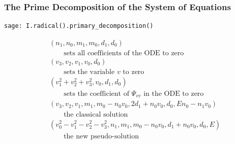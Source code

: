 \documentclass{beamer}
\begin{document}
\begin{frame}[fragile]
\frametitle{The Prime Decomposition of the System of Equations}
\begin{verbatim}
sage: I.radical().primary_decomposition()
\end{verbatim}

\begin{subequations}
\label{ideal}
\begin{align}
& \left(n_{1}, n_{0}, m_{1}, m_{0}, d_{1}, d_{0}\right)\label{ideal:5} \\
& \qquad \text{sets all coefficients of the ODE to zero} \nonumber \\
& \left(v_{3}, v_{2}, v_{1}, v_{0}, d_{0}\right)\label{ideal:4}\\
& \qquad \text{sets the variable $v$ to zero} \nonumber \\
& \left(v_{1}^{2} + v_{2}^{2} + v_{3}^{2}, v_{0}, d_{1}, d_{0}\right)\label{ideal:3}\\
& \qquad \text{sets the coefficient of $\Psi_{vv}$ in the ODE to zero} \nonumber \\
& \left(v_{3}, v_{2}, v_{1}, m_{1}, m_{0} - n_{0} v_{0}, 2 d_{1} + n_{0} v_{0}, d_{0}, E n_{0} - n_{1} v_{0}\right)\label{ideal:2}\\
& \qquad \text{the classical solution} \nonumber \\
& \left(v_{0}^{2} - v_{1}^{2} - v_{2}^{2} - v_{3}^{2}, n_{1}, m_{1}, m_{0} - n_{0} v_{0}, d_{1} + n_{0} v_{0}, d_{0}, E\right)\label{ideal:1}\\
& \qquad \text{the new pseudo-solution} \nonumber
\end{align}
\end{subequations}
\end{frame}
\end{document}
